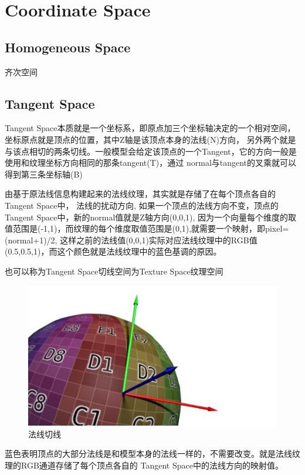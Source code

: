 
\chapter{Coordinate Space}

\section{Homogeneous Space}

齐次空间

\section{Tangent Space}

Tangent Space本质就是一个坐标系，即原点加三个坐标轴决定的一个相对空间，坐标原点就是顶点的位置，其中Z轴是该顶点本身的法线(N)方向，
另外两个就是与该点相切的两条切线。一般模型会给定该顶点的一个Tangent，它的方向一般是使用和纹理坐标方向相同的那条tangent(T)，通过
normal与tangent的叉乘就可以得到第三条坐标轴(B)

由基于原法线信息构建起来的法线纹理，其实就是存储了在每个顶点各自的Tangent Space中，
法线的扰动方向, 如果一个顶点的法线方向不变，顶点的Tangent Space中，新的normal值就是Z轴方向(0,0,1),
因为一个向量每个维度的取值范围是(-1,1)，而纹理的每个维度取值范围是(0,1),就需要一个映射，即pixel=(normal+1)/2,
这样之前的法线值(0,0,1)实际对应法线纹理中的RGB值(0.5,0.5,1)，而这个颜色就是法线纹理中的蓝色基调的原因。

也可以称为Tangent Space切线空间为Texture Space纹理空间

\begin{figure}[h]
    \centering
    \includegraphics[width=1\textwidth]{images/tangent.jpg}
    \caption{法线切线}    
\end{figure}

蓝色表明顶点的大部分法线是和模型本身的法线一样的，不需要改变。就是法线纹理的RGB通道存储了每个顶点各自的
Tangent Space中的法线方向的映射值。

